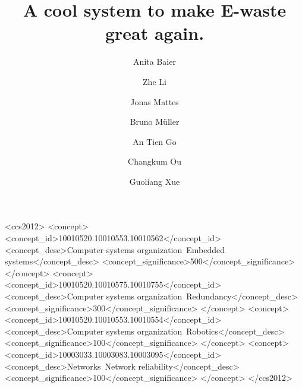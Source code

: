 \documentclass[sigchi-a, authorversion]{acmart}
\begin{document}
\title{A cool system to make E-waste great again.}

\author{Anita Baier}

\author{Zhe Li}

\author{Jonas Mattes}

\author{Bruno M\"uller}

\author{An Tien Go}

\author{Changkum Ou}

\author{Guoliang Xue}

\renewcommand{\shortauthors}{F. Author et al.}


%
%
\begin{CCSXML}
<ccs2012>
 <concept>
  <concept_id>10010520.10010553.10010562</concept_id>
  <concept_desc>Computer systems organization~Embedded systems</concept_desc>
  <concept_significance>500</concept_significance>
 </concept>
 <concept>
  <concept_id>10010520.10010575.10010755</concept_id>
  <concept_desc>Computer systems organization~Redundancy</concept_desc>
  <concept_significance>300</concept_significance>
 </concept>
 <concept>
  <concept_id>10010520.10010553.10010554</concept_id>
  <concept_desc>Computer systems organization~Robotics</concept_desc>
  <concept_significance>100</concept_significance>
 </concept>
 <concept>
  <concept_id>10003033.10003083.10003095</concept_id>
  <concept_desc>Networks~Network reliability</concept_desc>
  <concept_significance>100</concept_significance>
 </concept>
</ccs2012>  
\end{CCSXML}
\end{document}
